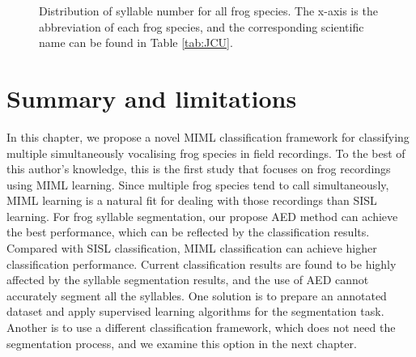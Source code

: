 \begin{figure}[htb!] %
\caption[Distribution of syllable number for all frog species]{Distribution of syllable number for all frog species. The x-axis is the abbreviation of each frog species, and the corresponding scientific name can be found in Table \ref{tab:JCU}.}
\label{fig:Ch6_syllable} 
\end{figure}

\section{Summary and limitations}
In this chapter, we propose a novel MIML classification framework for classifying multiple simultaneously vocalising frog species in field recordings. To the best of this author's knowledge, this is the first study that focuses on frog recordings using MIML learning. Since multiple frog species tend to call simultaneously, MIML learning is a natural fit for dealing with those recordings than SISL learning. For frog syllable segmentation, our propose AED method can achieve the best performance, which can be reflected by the classification results. Compared with SISL classification, MIML classification can achieve higher classification performance. Current classification results are found to be highly affected by the syllable segmentation results, and the use of AED cannot accurately segment all the syllables. One solution is to prepare an annotated dataset and apply supervised learning algorithms for the segmentation task. Another is to use a different classification framework, which does not need the segmentation process, and we examine this option in the next chapter.


